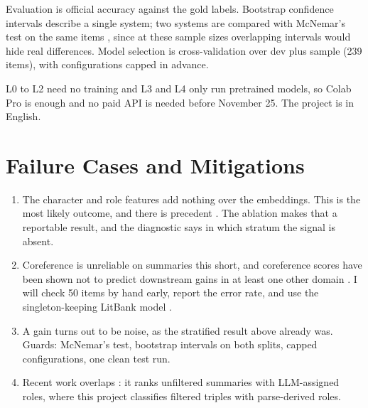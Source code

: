 \documentclass[11pt,letterpaper]{article}
\begin{document}
Evaluation is official accuracy against the gold labels. Bootstrap confidence intervals \cite[Section~4.11.1]{jm3}
describe a single system; two systems are compared with McNemar's test on the same items \cite{dietterich},
since at these sample sizes overlapping intervals would hide real differences. Model selection
is cross-validation over dev plus sample (239 items), with configurations capped in advance.

L0 to L2 need no training and L3 and L4 only run pretrained models, so Colab Pro is enough and no paid API is needed
before November 25. The project is in English.

\section{Failure Cases and Mitigations}

\begin{enumerate}[label=\textbf{F\arabic*.}]
\item The character and role features add nothing over the embeddings. This is the most likely outcome, and there
is precedent \cite{hatzel2023,glavas2021,chaturvedi2018}. The ablation makes that a reportable result, and the
diagnostic says in which stratum the signal is absent.
\item Coreference is unreliable on summaries this short, and coreference scores have been shown not to predict
downstream gains in at least one other domain \cite{chai2022}. I will check 50 items by hand early, report the
error rate, and use the singleton-keeping LitBank model \cite{maverick}.
\item A gain turns out to be noise, as the stratified result above already was. Guards: McNemar's test,
bootstrap intervals on both splits, capped configurations, one clean test run.
\item Recent work overlaps \cite{barancova2026}: it ranks unfiltered summaries with LLM-assigned roles, where
this project classifies filtered triples with parse-derived roles.
\end{enumerate}
\end{document}
